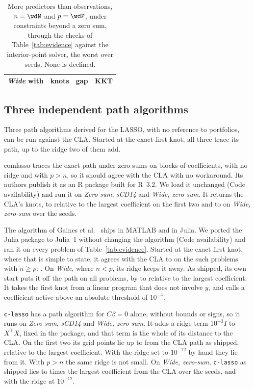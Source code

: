 \documentclass[11pt]{article}
\theoremstyle{remark}
\newcommand{\trans}{^{\top}}
\begin{document}
\begin{table}[!htbp]
\centering
\small
\begin{tabular}{lrcc}
\toprule
\emph{Wide} with & knots & gap & KKT \\
\midrule

\end{tabular}
\caption{More predictors than observations, $n=\wdN$ and $p=\wdP$, under constraints
beyond a zero sum, through the checks of Table~\ref{tab:evidence} against the
interior-point solver, the worst over \stSeeds{} seeds. None is declined.}
\label{tab:wide}
\end{table}

\subsection{Three independent path algorithms}
\label{sec:independent}

Three path algorithms derived for the LASSO, with no reference to portfolios, can be
run against the CLA. Started at the exact first knot, all three trace its path, up to
the ridge two of them add.

comlasso \cite{jeon2020} traces the exact path under zero sums on blocks of
coefficients, with no ridge and with $p>n$, so it should agree with the CLA with no
workaround. Its authors publish it as an R package built for R~3.2. We load it
unchanged (Code availability) and run it on \emph{Zero-sum}, \emph{sCD14} and
\emph{Wide, zero-sum}. It returns the CLA's knots, to \coGap{} relative to the largest
coefficient on the first two and to \coWideGap{} on \emph{Wide, zero-sum} over the
\stSeeds{} seeds.

The algorithm of Gaines et al.\ \cite{gaines2018} ships in MATLAB and in Julia. We
ported the Julia package to Julia~1 without changing the algorithm (Code availability)
and ran it on every problem of Table~\ref{tab:evidence}. Started at the exact first
knot, where that is simple to state, it agrees with the CLA to \gaStarted{} on the
\gaStartedCount{} such problems with $n\ge p$: \gaStartedNames{}. On \emph{Wide}, where $n<p$, its ridge
keeps it \gaWide{} away. As shipped, its own start puts it off the path on all
\gaProblems{} problems, by \gaShippedMin{} to \gaShippedMax{} relative to the largest
coefficient. It takes the first knot from a linear program that does not involve $y$,
and calls a coefficient active above an absolute threshold of $10^{-4}$.

\texttt{c-lasso} \cite{classo} has a path algorithm for $C\beta=0$ alone, without bounds
or signs, so it runs on \emph{Zero-sum}, \emph{sCD14} and \emph{Wide, zero-sum}. It
adds a ridge term $10^{-3}I$ to $X\trans X$, fixed in the package, and that term is the
whole of its distance to the CLA. On the first two its \clPoints{} grid points lie up
to \clGap{} from the CLA path as shipped, relative to the largest coefficient. With the
ridge set to $10^{-12}$ by hand they lie \clGapUnridged{} from it. With $p>n$ the same ridge is
not small. On \emph{Wide, zero-sum}, \texttt{c-lasso} as shipped lies \clWideGapLo{}
to \clWideGapHi{} times the largest coefficient from the CLA over the \stSeeds{} seeds,
and \clWideGapUnridged{} with the ridge at $10^{-12}$.
\end{document}
